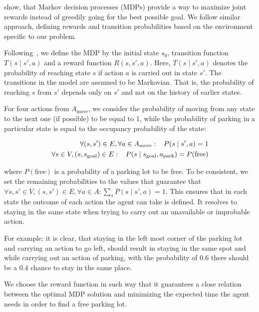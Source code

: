\citet{tipaldiICRA11} show, that Markov decision processes (MDPs) provide a
way to maximize joint rewards instead of greedily going for the best possible
goal. We follow similar approach, defining rewards and transition
probabilities based on the environment specific to our problem.

Following~\citet{bellman1957}, we define the MDP by the initial state $s_0$,
transition function $T(s \mid s', a)$ and a reward function $R(s, s', a)$.
Here, $T(s \mid s', a)$ denotes the probability of reaching state $s$ if
action $a$ is carried out in state $s'$. The transitions in the model are
assumed to be Markovian. That is, the probability of reaching $s$ from $s'$
depends only on $s'$ and not on the history of earlier states.

For four actions from $A_\mathrm{move}$, we consider the probability of moving
from any state to the next one (if possible) to be equal to 1, while the
probability of parking in a particular state is equal to the occupancy
probability of the state:

\begin{eqnarray}
\forall (s, s') \in E, \forall a \in A_{\mathrm{move}} : \hspace{3mm} P(s \mid s', a) = 1 \\
\forall s \in V, (s,s_{\mathrm{goal}}) \in E : \hspace{3mm} P(s \mid s_{\mathrm{goal}}, a_{\mathrm{park}}) = P(\mathrm{free})
\end{eqnarray}

where $P(\mathrm{free})$ is a probability of a parking lot to be free. To be
consistent, we set the remaining probabilities to the values that guarantee
that $\forall s, s' \in V, (s, s') \in E, \forall a \in A: \sum_{s}P(s \mid
s', a) = 1$. This ensures that in each state the outcome of each action the
agent can take is defined. It resolves to staying in the same state when
trying to carry out an unavailable or improbable action.

For example: it is clear, that staying in the left most corner of the parking
lot and carrying an action to go left, should result in staying in the same
spot and while carrying out an action of parking, with the probability of
$0.6$ there should be a $0.4$ chance to stay in the same place.

We choose the reward function in such way that it guarantees a close relation
between the optimal MDP solution and minimizing the expected time the agent
needs in order to find a free parking lot.

